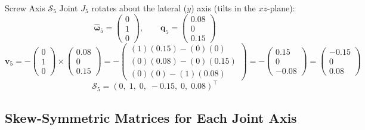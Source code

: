 \documentclass[12pt,a4paper]{article}
\newcommand{\vect}[1]{\bm{#1}}
\begin{document}
\begin{mathbox}{Screw Axis $\mathcal{S}_5$}
Joint $J_5$ rotates about the lateral ($y$) axis (tilts in the $xz$-plane):
\[
  \vect{\hat\omega}_5 = \begin{pmatrix}0\\1\\0\end{pmatrix}, \qquad
  \vect{q}_5 = \begin{pmatrix}0.08\\0\\0.15\end{pmatrix}
\]
\[
  \vect{v}_5
  = -\begin{pmatrix}0\\1\\0\end{pmatrix} \times \begin{pmatrix}0.08\\0\\0.15\end{pmatrix}
  = -\begin{pmatrix}(1)(0.15)-(0)(0)\\(0)(0.08)-(0)(0.15)\\(0)(0)-(1)(0.08)\end{pmatrix}
  = -\begin{pmatrix}0.15\\0\\-0.08\end{pmatrix}
  = \begin{pmatrix}-0.15\\0\\0.08\end{pmatrix}
\]
\[
  \boxed{\mathcal{S}_5 = (0,\;1,\;0,\;-0.15,\;0,\;0.08)^\top}
\]
\end{mathbox}

\subsection{Skew-Symmetric Matrices for Each Joint Axis}
\end{document}
